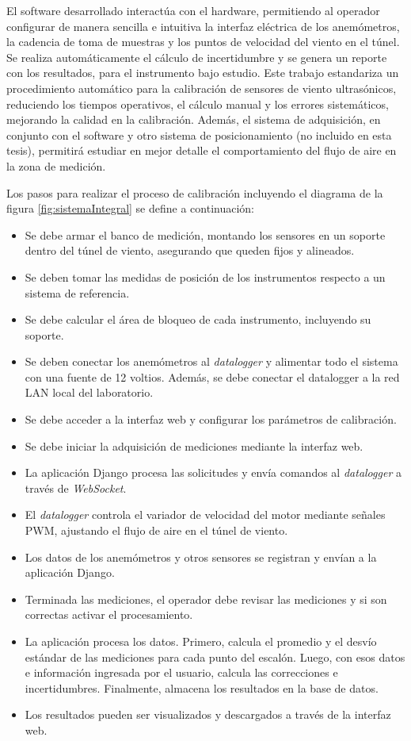 El software desarrollado interactúa con el hardware, permitiendo al operador configurar de manera sencilla e intuitiva la interfaz eléctrica de los anemómetros, la cadencia de toma de muestras y los puntos de velocidad del viento en el túnel. Se realiza automáticamente el cálculo de incertidumbre y se genera un reporte con los resultados, para el instrumento bajo estudio. Este trabajo estandariza un procedimiento automático para la calibración de sensores de viento ultrasónicos, reduciendo los tiempos operativos, el cálculo manual y los errores sistemáticos, mejorando la calidad en la calibración. Además, el sistema de adquisición, en conjunto con el software y otro sistema de posicionamiento (no incluido en esta tesis), permitirá estudiar en mejor detalle el comportamiento del flujo de aire en la zona de medición.

Los pasos para realizar el proceso de calibración incluyendo el diagrama de la figura \ref{fig:sistemaIntegral} se define a continuación:
\begin{itemize}
    \item Se debe armar el banco de medición, montando los sensores en un soporte dentro del túnel de viento, asegurando que queden fijos y alineados.
    \item Se deben tomar las medidas de posición de los instrumentos respecto a un sistema de referencia.
    \item Se debe calcular el área de bloqueo de cada instrumento, incluyendo su soporte.
    \item Se deben conectar los anemómetros al \textit{datalogger} y alimentar todo el sistema con una fuente de 12 voltios. Además, se debe conectar el {datalogger} a la red LAN local del laboratorio.
    \item Se debe acceder a la interfaz web y configurar los parámetros de calibración.
    \item Se debe iniciar la adquisición de mediciones mediante la interfaz web.
    \item La aplicación Django procesa las solicitudes y envía comandos al \textit{datalogger} a través de \textit{WebSocket}.
    \item El \textit{datalogger} controla el variador de velocidad del motor mediante señales PWM, ajustando el flujo de aire en el túnel de viento.
    \item Los datos de los anemómetros y otros sensores se registran y envían a la aplicación Django.
    \item Terminada las mediciones, el operador debe revisar las mediciones y si son correctas activar el procesamiento.
    \item La aplicación procesa los datos. Primero, calcula el promedio y el desvío estándar de las mediciones para cada punto del escalón. Luego, con esos datos e información ingresada por el usuario, calcula las correcciones e incertidumbres. Finalmente, almacena los resultados en la base de datos.
    \item Los resultados pueden ser visualizados y descargados a través de la interfaz web.
\end{itemize}


